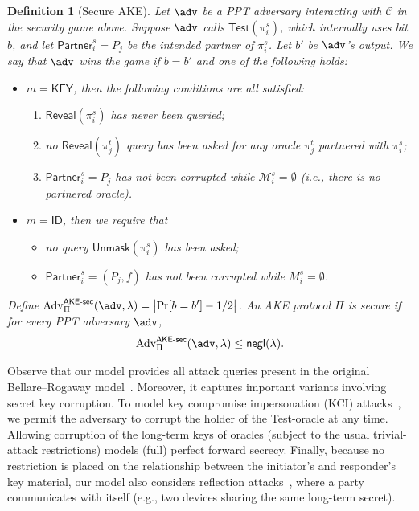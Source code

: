 \documentclass[runningheads]{llncs}
\newtheorem{defn}{Definition}[]
\newcommand{\negli}{\mathsf{negl}}
\begin{document}
\begin{defn}[Secure AKE]
Let $\adv$ be a PPT adversary interacting with $\mathcal{C}$ in the security game above. Suppose $\adv$ calls $\textsf{Test}(\pi_i^s)$, which internally uses bit $b$, and let $\mathsf{Partner}_{i}^{s} = P_j$ be the intended partner of $\pi_i^s$. Let $b'$ be $\adv$’s output. We say that $\adv$ \textit{wins} the game if $b = b'$ and one of the following holds:
\begin{itemize}
    \item $m = \mathsf{KEY}$, then the following conditions are all satisfied:
\begin{enumerate}
  \item $\textsf{Reveal}(\pi_i^s)$ has never been queried;
  \item no $\textsf{Reveal}(\pi_j^t)$ query has been asked for any oracle $\pi_j^t$ partnered with $\pi_i^s$;
  \item $\mathsf{Partner}_{i}^{s} = P_j$ has not been corrupted while $\mathcal{M}_i^s = \emptyset$ (i.e., there is no partnered oracle).
\end{enumerate}
\item $m = \mathsf{ID}$, then we require that
\begin{itemize}
    \item no query $\mathsf{Unmask}(\pi_i^s)$ has been asked;
    \item $\mathsf{Partner}_{i}^{s} = (P_{j},f)$ has not been corrupted while $M_i^s = \emptyset$.
\end{itemize}
\end{itemize}

Define $\mathrm{Adv}_{\Pi}^{\mathsf{AKE}\text{-}\mathsf{sec}}(\adv, \lambda) = \bigl|\Pr[b = b'] - 1/2\bigr|$.
An AKE protocol $\Pi$ is \textit{secure} if for every PPT adversary $\adv$,
\[
\mathrm{Adv}_{\Pi}^{\mathsf{AKE}\text{-}\mathsf{sec}}(\adv, \lambda) \leq \negli(\lambda).
\]
\end{defn}

Observe that our model provides all attack queries present in the original Bellare–Rogaway model~\cite{C:BelRog93}.
Moreover, it captures important variants involving secret key corruption. To model key compromise impersonation (KCI) attacks~\cite{C:Krawczyk05}, we permit the adversary to corrupt the holder of the Test-oracle at any time.
Allowing corruption of the long-term keys of oracles (subject to the usual trivial-attack restrictions) models (full) perfect forward secrecy.
Finally, because no restriction is placed on the relationship between the initiator’s and responder’s key material, our model also considers reflection attacks~\cite{C:Krawczyk05}, where a party communicates with itself (e.g., two devices sharing the same long-term secret).
\end{document}
